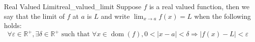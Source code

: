 \begin{definition}{Real Valued Limit}{real_valued_limit}
    Suppose $ f $ is a real valued function, then we say that the limit of $ f $ at $ a $ is $ L $ and write $ \lim_{ x \to a } f\left( x \right) = L $ when the following holds:
    \[
    \forall \varepsilon \in \mathbb{R}^{+} , \exists \delta \in \mathbb{R}^{+} \text{ such that  } \forall x \in  \operatorname{ dom  } \left( f \right), 0 < \left| x -  a \right| < \delta \Rightarrow \left| f\left( x \right) -  L \right| < \varepsilon 
    \]
\end{definition}
